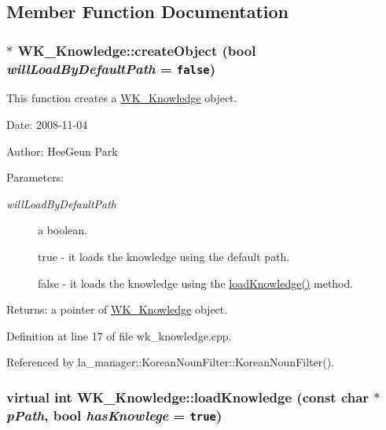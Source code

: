 \subsection{Member Function Documentation}
\hypertarget{classWK__Knowledge_63c8fd907321f33da86df178f2c6e839}{
\subsubsection[{createObject}]{ $\ast$ WK\_\-Knowledge::createObject (bool {\em willLoadByDefaultPath} = {\tt false})}}
\label{classWK__Knowledge_63c8fd907321f33da86df178f2c6e839}


This function creates a \hyperlink{classWK__Knowledge}{WK\_\-Knowledge} object. 

\begin{Desc}
\item[Date:]2008-11-04 \end{Desc}
\begin{Desc}
\item[Author:]HeeGeun Park \end{Desc}
\begin{Desc}
\item[Parameters:]
\begin{description}
\item[{\em willLoadByDefaultPath}]a boolean. \par
 true - it loads the knowledge using the default path. \par
 false - it loads the knowledge using the \hyperlink{classWK__Knowledge_0d5580699f2b12ebee77e72ac95d45d2}{loadKnowledge()} method. \end{description}
\end{Desc}
\begin{Desc}
\item[Returns:]a pointer of \hyperlink{classWK__Knowledge}{WK\_\-Knowledge} object. \end{Desc}


Definition at line 17 of file wk\_\-knowledge.cpp.

Referenced by la\_\-manager::KoreanNounFilter::KoreanNounFilter().\hypertarget{classWK__Knowledge_0d5580699f2b12ebee77e72ac95d45d2}{
\subsubsection[{loadKnowledge}]{\setlength{\rightskip}{0pt plus 5cm}virtual int WK\_\-Knowledge::loadKnowledge (const char $\ast$ {\em pPath}, \/  bool {\em hasKnowlege} = {\tt true})}}
\label{classWK__Knowledge_0d5580699f2b12ebee77e72ac95d45d2}


